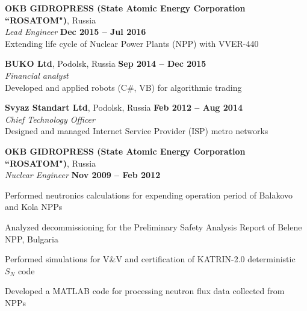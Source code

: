 \documentclass[margin,line]{resume}
\begin{document}
\begin{resume}
    \textbf{OKB GIDROPRESS (State Atomic Energy Corporation ``ROSATOM")}, 
    Russia \\
		\textsl{Lead Engineer} \hfill \textbf{Dec 2015 -- Jul 2016}\\
                Extending life cycle of Nuclear Power Plants (NPP) with 
                VVER-440

    \textbf{BUKO Ltd}, Podolsk, Russia \hfill \textbf{Sep 2014 -- Dec 2015}\\
		\textsl{Financial analyst}\\
		Developed and applied robots (C\#, VB) for algorithmic trading

    \textbf{Svyaz Standart Ltd}, Podolsk, Russia \hfill \textbf{Feb 2012 -- Aug 2014}\\
		\textsl{Chief Technology Officer}\\
		Designed and managed Internet Service Provider (ISP) metro networks

    \textbf{OKB GIDROPRESS (State Atomic Energy Corporation ``ROSATOM")}, 
    Russia \\
		\textsl{Nuclear Engineer} \hfill \textbf{Nov 2009 -- Feb 2012}\\
                \vspace{-4mm}\begin{list2}
				\item Performed neutronics calculations for expending 
				operation period of Balakovo and Kola NPPs
				\item Analyzed decommissioning for the Preliminary Safety 
				Analysis Report of Belene NPP, Bulgaria
				\item Performed simulations for V\&V and certification of  
				KATRIN-2.0 deterministic $S_N$ code
				\item Developed a MATLAB code for processing neutron flux data 
				collected from NPPs
                \end{list2}


\end{resume}
\end{document}

